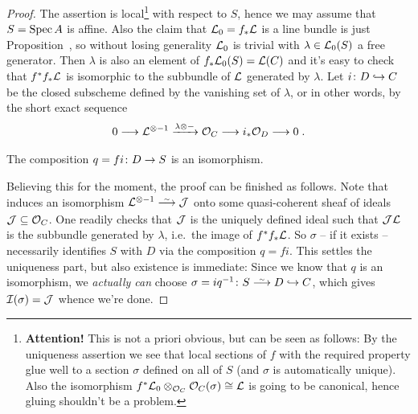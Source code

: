\documentclass[a4paper,parskip=half,numbers=enddot, DIV=12]{scrreprt}
\begin{document}
\begin{proof}
	The assertion is local\footnote{\textbf{Attention!} This is not a priori obvious, but can be seen as follows: By the uniqueness assertion we see that local sections of $f$ with the required property glue well to a section $\sigma$ defined on all of $S$ (and $\sigma$ is automatically unique). Also the isomorphism $f^*\mathcal{L}_0\otimes_{\mathcal{O}_C}\mathcal{O}_C(\sigma)\cong\mathcal{L}$ is going to be canonical, hence gluing shouldn't be a problem.} with respect to $S$, hence we may assume that $S=\operatorname{Spec} A$ is affine. Also the claim that $\mathcal{L}_0=f_*\mathcal{L}$ is a line bundle is just Proposition~, so without losing generality $\mathcal{L}_0$ is trivial with $\lambda\in\mathcal{L}_0(S)$ a free generator. Then $\lambda$ is also an element of $f_*\mathcal{L}_0(S)=\mathcal{L}(C)$ and it's easy to check that $f^*f_*\mathcal{L}$ is isomorphic to the subbundle of $\mathcal{L}$ generated by $\lambda$. Let $i\colon D\monomorphism C$ be the closed subscheme defined by the vanishing set of $\lambda$, or in other words, by the short exact sequence
	\begin{align}\lbl{eq:SESforD}
		0\morphism\Ll^{\otimes -1}\xrightarrow{\lambda\otimes-}\Oo_C\morphism i_*\Oo_D\morphism 0\;.
	\end{align}
	\begin{claim}
		The composition $q=fi\colon D\morphism S$ is an isomorphism.
	\end{claim}
	Believing this for the moment, the proof can be finished as follows. Note that  induces an isomorphism $\Ll^{\otimes -1}\isomorphism\Jj$ onto some quasi-coherent sheaf of ideals $\mathcal{J}\subseteq \mathcal{O}_C$. One readily checks that $\mathcal{J}$ is the uniquely defined ideal such that $\mathcal{J}\mathcal{L}$ is the subbundle generated by $\lambda$, i.e.\ the image of $f^*f_*\mathcal{L}$. So $\sigma$ -- if it exists -- necessarily identifies $S$ with $D$ via the composition $q=fi$. This settles the uniqueness part, but also existence is immediate: Since we know that $q$ is an isomorphism, we \emph{actually can} choose $\sigma=iq^{-1}\colon S\isomorphism D\monomorphism C$, which gives $\mathcal{I}(\sigma)=\mathcal{J}$ whence we're done.
	

\end{proof}
\end{document}
